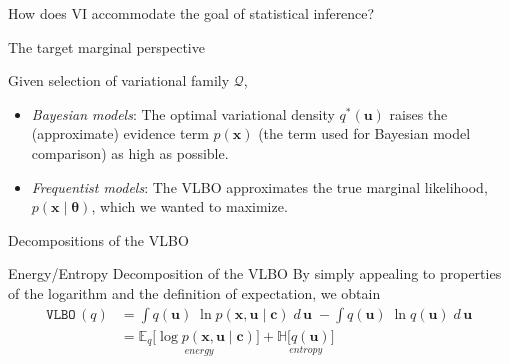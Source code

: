 \documentclass[10pt]{beamer}
\newcommand{\ds}{\displaystyle}
\newcommand{\+}[1]{\ensuremath{{\boldsymbol #1}}} %
\newcommand{\cond}{\; | \;}
\newcommand{\E}{\mathbb{E}}
\newcommand{\Q}{\mathcal{Q}}
\newcommand{\wrt}[1]{\; d \,{#1} \;}
\newcommand{\VLBO}{\,\texttt{VLBO}\,}
\begin{document}
\begin{frame}{How does VI accommodate the goal of statistical inference?}
\begin{block}{The target marginal perspective}

Given selection of variational family $\Q$, 

\begin{itemize}

\item \textit{Bayesian models}: The optimal variational density $q^*(\+u)$ raises the (approximate) evidence term $p(\+x)$ (the term used for Bayesian model comparison) as high as possible. %
\item \textit{Frequentist models}: The VLBO approximates the true marginal likelihood, $p(\+x \cond \+\theta)$, which we wanted to maximize.

\end{itemize}

\end{block} 
\end{frame}

\begin{frame}{Decompositions of the VLBO}
\begin{block}{Energy/Entropy Decomposition of the VLBO}
By simply appealing to properties of the logarithm and the definition of expectation, we obtain 
\begin{align*}
\VLBO(q) & = \ds\int  q(\+u) \; \ln p(\+x,\+u  \cond \+c) \wrt{\+u}   - \ds\int  q(\+u) \; \ln q(\+u) \wrt{\+u}  \\
& =  \underset{energy}{ \E_q \big[ \log p(\+x, \+u  \cond \+c ) \big] } + \underset{entropy}{ \mathbb{H} \big[q(\+u) \big] }  
\end{align*}
\end{block} 
\end{frame}
\end{document}
